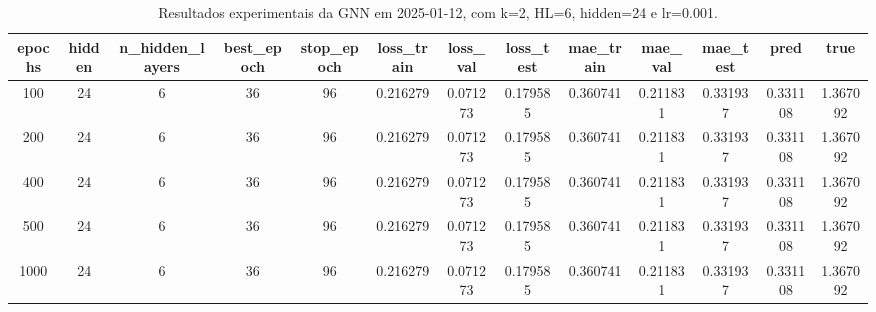 \begin{table}[h]
\centering
\caption{Resultados experimentais da GNN em 2025-01-12, com k=2, HL=6, hidden=24 e lr=0.001.}
\label{tab:gnn_results_k2_hl6_h24_d20250112}
\begin{tabular}{ccccccccccccc}
\toprule
epochs & hidden & n\_hidden\_layers & best\_epoch & stop\_epoch & loss\_train & loss\_val & loss\_test & mae\_train & mae\_val & mae\_test & pred & true \\
\midrule
100 & 24 & 6 & 36 & 96 & 0.216279 & 0.071273 & 0.179585 & 0.360741 & 0.211831 & 0.331937 & 0.331108 & 1.367092 \\
200 & 24 & 6 & 36 & 96 & 0.216279 & 0.071273 & 0.179585 & 0.360741 & 0.211831 & 0.331937 & 0.331108 & 1.367092 \\
400 & 24 & 6 & 36 & 96 & 0.216279 & 0.071273 & 0.179585 & 0.360741 & 0.211831 & 0.331937 & 0.331108 & 1.367092 \\
500 & 24 & 6 & 36 & 96 & 0.216279 & 0.071273 & 0.179585 & 0.360741 & 0.211831 & 0.331937 & 0.331108 & 1.367092 \\
1000 & 24 & 6 & 36 & 96 & 0.216279 & 0.071273 & 0.179585 & 0.360741 & 0.211831 & 0.331937 & 0.331108 & 1.367092 \\
\bottomrule
\end{tabular}
\end{table}
